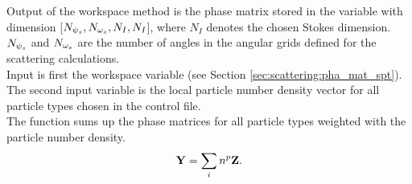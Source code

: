 Output of the workspace method  is the phase
matrix stored in the variable   with dimension
[$N_{{\psi_s}}, N_{{\omega_s}}, N_{I}, N_{I}$], where $N_{I}$ denotes the
chosen Stokes dimension.  $N_{{\psi_s}}$ and 
$N_{{\omega_s}}$ are the number of angles in the angular grids defined for
the scattering calculations.\\
Input is first the workspace variable  (see Section
\ref{sec:scattering:pha_mat_spt}). The second input variable is the
local particle number density vector  for all
particle types chosen in the control file.\\
The function sums up the phase matrices for all particle types
weighted with the particle number density.
\begin{eqnarray}
{\bf Y} = \sum_i{n^p{\bf Z}}.
\end{eqnarray}

\label{sec:scattering:pha_mat_spt}

